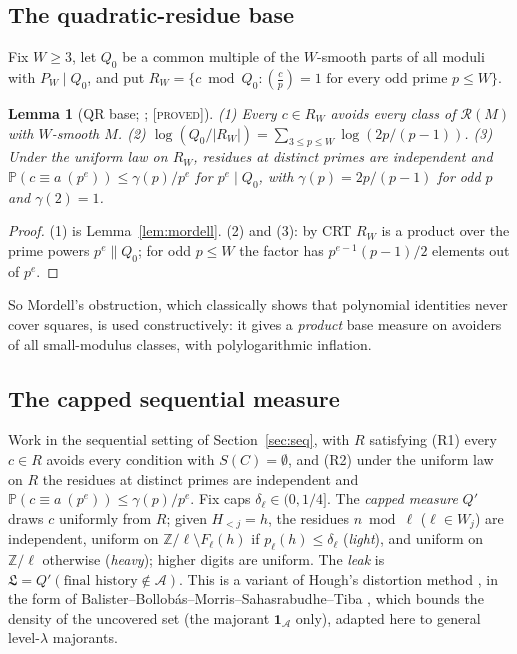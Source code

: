 \documentclass[10pt,reqno]{amsart}
\newtheorem{lemma}[theorem]{Lemma}
\theoremstyle{definition}
\theoremstyle{remark}
\newcommand{\A}{\mathcal A}
\newcommand{\cR}{\mathscr R}
\newcommand{\Prob}{\mathbb P}
\newcommand{\Z}{\mathbb Z}
\newcommand{\ind}{\mathbf 1}
\newcommand{\lab}[1]{\textup{[\textsc{#1}]}}
\begin{document}
\subsection{The quadratic-residue base}
Fix $W\geq3$, let $Q_0$ be a common multiple of the $W$-smooth parts of all
moduli with $P_W\mid Q_0$, and put
$R_W=\{c\bmod Q_0:(\frac cp)=1\text{ for every odd prime }p\leq W\}$.

\begin{lemma}[QR base; {\cite[Lemma~1.3]{TW}}; \lab{proved}]\label{lem:QR}
(1) Every $c\in R_W$ avoids every class of $\cR(M)$ with $W$-smooth $M$.
(2) $\log(Q_0/|R_W|)=\sum_{3\leq p\leq W}\log(2p/(p-1))$.
(3) Under the uniform law on $R_W$, residues at distinct primes are
independent and $\Prob(c\equiv a\ (p^e))\leq\gamma(p)/p^e$ for $p^e\mid Q_0$,
with $\gamma(p)=2p/(p-1)$ for odd $p$ and $\gamma(2)=1$.
\end{lemma}
\begin{proof}
(1) is Lemma~\ref{lem:mordell}.  (2) and (3): by CRT $R_W$ is a product
over the prime powers $p^e\|Q_0$; for odd $p\leq W$ the factor has
$p^{e-1}(p-1)/2$ elements out of $p^e$.
\end{proof}
So Mordell's obstruction, which classically shows that polynomial
identities never cover squares, is used constructively: it gives a
\emph{product} base measure on avoiders of all small-modulus classes,
with polylogarithmic inflation.

\subsection{The capped sequential measure}\label{sec:capped}
Work in the sequential setting of Section~\ref{sec:seq}, with $R$
satisfying (R1) every $c\in R$ avoids every condition with $S(C)=\emptyset$,
and (R2) under the uniform law on $R$ the residues at distinct primes are
independent and $\Prob(c\equiv a\ (p^e))\leq\gamma(p)/p^e$.  Fix caps
$\delta_\ell\in(0,1/4]$.  The \emph{capped measure} $Q'$ draws $c$ uniformly
from $R$; given $H_{<j}=h$, the residues $n\bmod\ell$ ($\ell\in W_j$) are
independent, uniform on $\Z/\ell\setminus F_\ell(h)$ if
$p_\ell(h)\leq\delta_\ell$ (\emph{light}), and uniform on $\Z/\ell$
otherwise (\emph{heavy}); higher digits are uniform.  The \emph{leak} is
$\mathfrak L=Q'(\text{final history}\notin\A)$.  This is a variant of
Hough's distortion method \cite{Hough}, in the form of
Balister--Bollob\'as--Morris--Sahasrabudhe--Tiba \cite{BBMST}, which bounds
the density of the uncovered set (the majorant $\ind_\A$ only), adapted
here to general level-$\lambda$ majorants.
\end{document}
